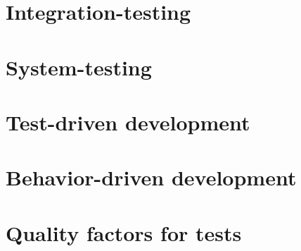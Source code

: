 \documentclass[a4paper]{report}
\begin{document}
  \section{Integration-testing}
  

  \section{System-testing}
  

  \section{Test-driven development}
  

  \section{Behavior-driven development}
  

  \section{Quality factors for tests}
  


\newpage


\end{document}

